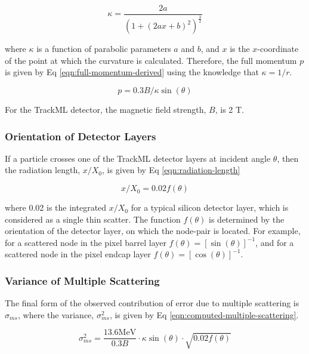 \begin{equation}
\kappa = \frac{2a}{(1 + (2ax + b)^2)^{\frac{3}{2}}}
\label{eqn:kappa}
\end{equation}

where $\kappa$ is a function of parabolic parameters $a$ and $b$, and $x$ is the $x$-coordinate of the point at which the curvature is calculated. Therefore, the full momentum $p$ is given by Eq \eqref{eqn:full-momentum-derived} using the knowledge that $\kappa = 1/r$.

\begin{equation}
p = 0.3 B / \kappa \sin(\theta)
\label{eqn:full-momentum-derived}
\end{equation}

For the TrackML detector, the magnetic field strength, $B$, is 2 T.

\subsubsection{Orientation of Detector Layers}

If a particle crosses one of the TrackML detector layers at incident angle $\theta$, then the radiation length, $x/X_0$, is given by Eq \eqref{eqn:radiation-length}

\begin{equation}
x/X_0 = 0.02 f(\theta)
\label{eqn:radiation-length}
\end{equation}

where 0.02 is the integrated $x/X_0$ for a typical silicon detector layer, which is considered as a single thin scatter. The function $f(\theta)$ is determined by the orientation of the detector layer, on which the node-pair is located. For example, for a scattered node in the pixel barrel layer $f(\theta) = [\sin(\theta)]^{-1}$, and for a scattered node in the pixel endcap layer $f(\theta) = [\cos(\theta)]^{-1}$.




\subsubsection{Variance of Multiple Scattering}

The final form of the observed contribution of error due to multiple scattering is $\sigma_{ms}$, where the variance, $\sigma_{ms}^2$, is given by Eq \eqref{eqn:computed-multiple-scattering}.

\begin{equation}
    \sigma_{ms}^{2} = \frac{13.6 \text{MeV}}{0.3 B} \cdot \kappa \sin(\theta) \cdot \sqrt{0.02 f(\theta)}
    \label{eqn:computed-multiple-scattering}
\end{equation}



